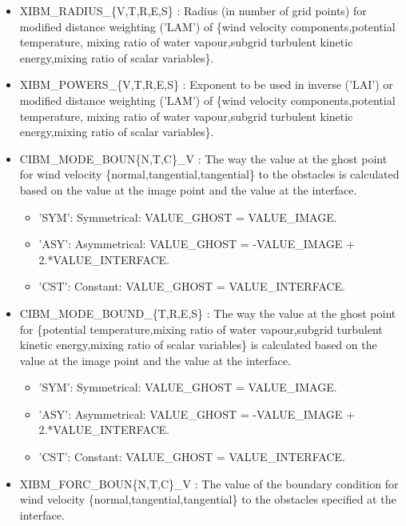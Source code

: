\begin{itemize}
\item XIBM\_RADIUS\_\{V,T,R,E,S\} :
Radius (in number of grid points) for modified distance
weighting ('LAM') of \{wind velocity components,potential temperature,
mixing ratio of water vapour,subgrid turbulent kinetic energy,mixing
ratio of scalar variables\}.

\item XIBM\_POWERS\_\{V,T,R,E,S\} :
Exponent to be used in inverse ('LAI') or modified distance
weighting ('LAM') of \{wind velocity components,potential temperature,
mixing ratio of water vapour,subgrid turbulent kinetic energy,mixing
ratio of scalar variables\}.
       
\item CIBM\_MODE\_BOUN\{N,T,C\}\_V :
The way the value at the ghost point for wind velocity
\{normal,tangential,tangential\} to the obstacles is calculated based on the value at the
image point and the value at the interface.
\begin{itemize}
\item 'SYM': Symmetrical: VALUE\_GHOST = VALUE\_IMAGE.
\item 'ASY': Asymmetrical: VALUE\_GHOST = -VALUE\_IMAGE + 2.*VALUE\_INTERFACE.
\item 'CST': Constant: VALUE\_GHOST = VALUE\_INTERFACE.
\end{itemize}

\item CIBM\_MODE\_BOUND\_\{T,R,E,S\} :
The way the value at the ghost point for \{potential
temperature,mixing ratio of water vapour,subgrid turbulent kinetic energy,mixing ratio of scalar variables\}
is calculated based on the value at the image point and the value at the interface.
\begin{itemize}
\item 'SYM': Symmetrical: VALUE\_GHOST = VALUE\_IMAGE.
\item 'ASY': Asymmetrical: VALUE\_GHOST = -VALUE\_IMAGE + 2.*VALUE\_INTERFACE.
\item 'CST': Constant: VALUE\_GHOST = VALUE\_INTERFACE.
\end{itemize}

\item XIBM\_FORC\_BOUN\{N,T,C\}\_V :
The value of the boundary condition for wind velocity \{normal,tangential,tangential\} to the
obstacles specified at the interface. 
  

\end{itemize}
